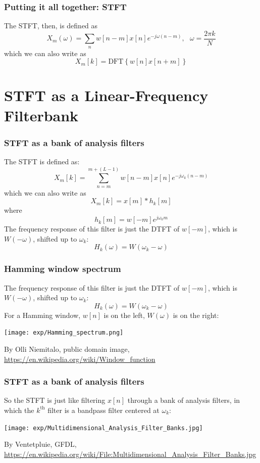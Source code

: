 \documentclass{beamer}
\begin{document}
\begin{frame}
  \frametitle{Putting it all together: STFT}
  The STFT, then, is defined as
  \[
  X_m(\omega)= \sum_{n} w[n-m]x[n]e^{-j\omega (n-m)},~~~\omega=\frac{2\pi k}{N}
  \]
  which we can also write as
  \[
  X_m[k] = \mbox{DFT}\left\{w[n]x[n+m]\right\}
  \]
\end{frame}

\section[Linear Frequency]{STFT as a Linear-Frequency Filterbank}
\setcounter{subsection}{1}

\begin{frame}
  \frametitle{STFT as a bank of analysis filters}

  The STFT is defined as:
  \[
  X_m[k] = \sum_{n=m}^{m+(L-1)} w[n-m]x[n]e^{-j\omega_k(n-m)}
  \]
  which we can also write as
  \[
  X_m[k] = x[m] \ast h_k[m]
  \]
  where
  \[
  h_k[m] = w[-m]e^{j\omega_k m}
  \]
  The frequency response of this filter is just the DTFT of $w[-m]$,
  which is $W(-\omega)$, shifted up to $\omega_k$:
  \[
  H_k(\omega) = W\left(\omega_k-\omega\right)
  \]
\end{frame}

\begin{frame}
  \frametitle{Hamming window spectrum}

  The frequency response of this filter is just the DTFT of $w[-m]$,
  which is $W(-\omega)$, shifted up to $\omega_k$:
  \[
  H_k(\omega) = W\left(\omega_k-\omega\right)
  \]
  For a Hamming window, $w[n]$ is on the left, $W(\omega)$ is on the right:
  \centerline{\texttt{[image: exp/Hamming\_spectrum.png]}}
  \begin{tiny}
    By Olli Niemitalo, public domain image,
    \url{https://en.wikipedia.org/wiki/Window_function}
  \end{tiny}
\end{frame}
  
\begin{frame}
  \frametitle{STFT as a bank of analysis filters}

  So the STFT is just like filtering $x[n]$ through a bank of analysis
  filters, in which the $k^{\textrm{th}}$ filter is a bandpass filter
  centered at $\omega_k$:
  \centerline{\texttt{[image: exp/Multidimensional\_Analysis\_Filter\_Banks.jpg]}}
  \begin{tiny}
    By Ventetpluie, GFDL,
    \url{https://en.wikipedia.org/wiki/File:Multidimensional_Analysis_Filter_Banks.jpg}
  \end{tiny}
\end{frame}
\end{document}
